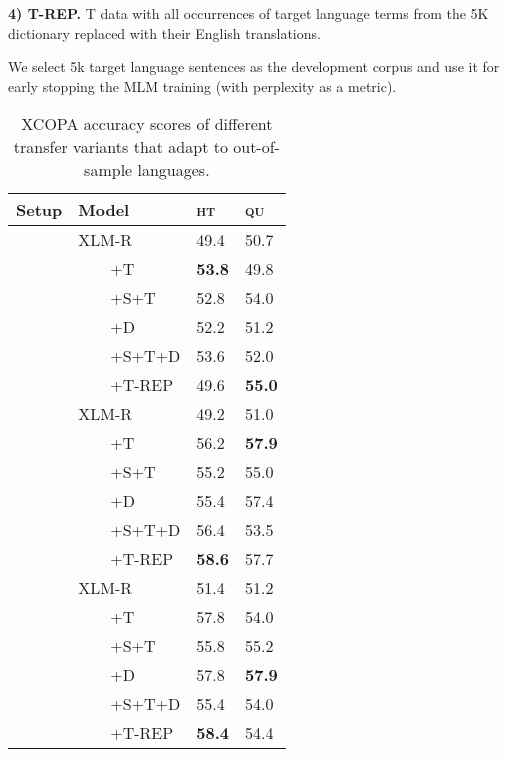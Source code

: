 \documentclass[11pt,a4paper]{article}
\begin{document}
\vspace{1.3mm}
\noindent \textbf{4) T-REP.} T data with all occurrences of target language terms from the 5K dictionary replaced with their English translations.







\vspace{1.5mm}

\noindent We select 5k target language sentences as the development corpus and use it for early stopping the MLM training (with perplexity as a metric).

\setlength{\tabcolsep}{7pt}
\begin{table}[t]
    \centering
    {\footnotesize
    \begin{tabularx}{\linewidth}{c l Y Y}
    \toprule
\textbf{Setup} & \textbf{Model} & \textsc{ht} & \textsc{qu} \\ \midrule
{} & XLM-R & 49.4 & 50.7 \\  
& ~~~~+T & \textbf{53.8} & 49.8 \\
& ~~~~+S+T & 52.8 & 54.0 \\ 
& ~~~~+D & 52.2 & 51.2 \\ 
& ~~~~+S+T+D & 53.6 & 52.0 \\
& ~~~~+T-REP & 49.6 & \textbf{55.0} \\ \midrule
{} & XLM-R & 49.2 & 51.0\\  
& ~~~~+T & 56.2 & \textbf{57.9} \\
& ~~~~+S+T & 55.2 & 55.0 \\ 
& ~~~~+D & 55.4 & 57.4 \\ 
& ~~~~+S+T+D & 56.4 & 53.5 \\
& ~~~~+T-REP & \textbf{58.6} & 57.7 \\ \midrule
{} & XLM-R & 51.4 & 51.2 \\  
& ~~~~+T & 57.8 & 54.0 \\
& ~~~~+S+T & 55.8 & 55.2  \\ 
& ~~~~+D & 57.8 & \textbf{57.9} \\ 
& ~~~~+S+T+D & 55.4 & 54.0 \\
& ~~~~+T-REP & \textbf{58.4} & 54.4 \\
\bottomrule
\end{tabularx}
}\vspace{-1.5mm}
    \caption{XCOPA accuracy scores of different transfer variants that adapt to out-of-sample languages.}
    \label{tab:extension_results}
    \vspace{-1.5mm}
\end{table}
\end{document}
